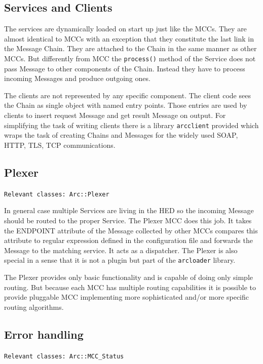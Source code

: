 \documentclass{book}
\begin{document}
\subsection{Services and Clients}

The services are dynamically loaded on start up just like the MCCs. They are almost identical to MCCs with an exception that they constitute the last link in the Message Chain. They are attached to the Chain in the same manner as other MCCs. But differently from MCC the \texttt{process()} method of the Service does not pass Message to other components of the Chain. Instead they have to process incoming Messages and produce outgoing ones.

The clients are not represented by any specific component. The client code sees the Chain as single object with named entry points. Those entries are used by clients to insert request Message and get result Message on output. For simplifying the task of writing clients there is a library \texttt{arcclient} provided which wraps the task of creating Chains and Messages for the widely used SOAP, HTTP, TLS, TCP communications.


\subsection{Plexer}

\texttt{Relevant classes: Arc::Plexer }

In general case multiple Services are living in the HED so the incoming Message should be routed to the proper Service. The Plexer MCC does this job. It takes the ENDPOINT attribute of the Message collected by other MCCs compares this attribute to regular expression defined in the configuration file and forwards the Message to the matching service. It acts as a dispatcher. The Plexer is also special in a sense that it is not a plugin but part of the \texttt{arcloader} library. 

The Plexer provides only basic functionality and is capable of doing only simple routing. But because each MCC has multiple routing capabilities it is possible to provide pluggable MCC implementing more sophisticated and/or more specific routing algorithms.


\subsection{Error handling}

\texttt{Relevant classes: Arc::MCC\_Status}
\end{document}
